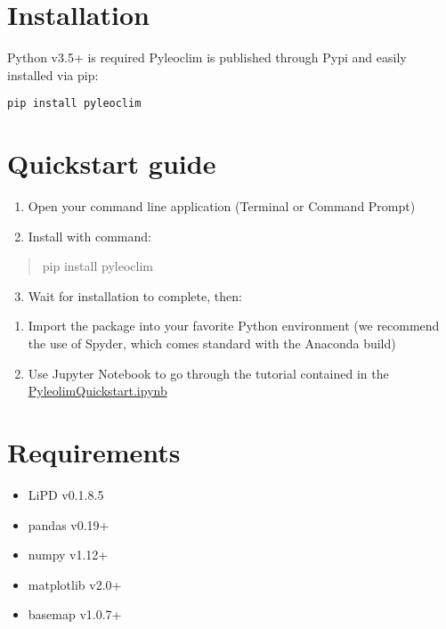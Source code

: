 \documentclass[letterpaper,10pt,english]{sphinxmanual}
\begin{document}
\section{Installation}
\label{Introduction:installation}
Python v3.5+ is required
Pyleoclim is published through Pypi and easily installed via pip:

\begin{Verbatim}[commandchars=\\\{\}]
pip install pyleoclim
\end{Verbatim}


\section{Quickstart guide}
\label{Introduction:quickstart-guide}\begin{enumerate}
\item {} 
Open your command line application (Terminal or Command Prompt)

\item {} 
Install with command:

\end{enumerate}
\begin{quote}

pip install pyleoclim
\end{quote}
\begin{enumerate}
\setcounter{enumi}{2}
\item {} 
Wait for installation to complete, then:

\end{enumerate}
\begin{enumerate}
\item {} 
Import the package into your favorite Python environment (we recommend the use of Spyder, which comes standard with the Anaconda build)

\item {} 
Use Jupyter Notebook to go through the tutorial contained in the \href{https://github.com/LinkedEarth/Pyleoclim\_util/tree/master/Example}{PyleolimQuickstart.ipynb}

\end{enumerate}


\section{Requirements}
\label{Introduction:requirements}\begin{itemize}
\item {} 
LiPD v0.1.8.5

\item {} 
pandas v0.19+

\item {} 
numpy v1.12+

\item {} 
matplotlib v2.0+

\item {} 
basemap v1.0.7+

\end{itemize}
\end{document}
